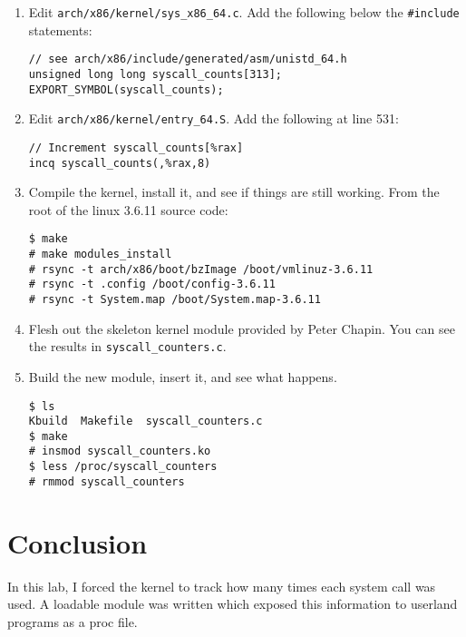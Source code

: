 \documentclass{article}
\newcommand{\filename}[1]{\texttt{#1}}
\newcommand{\code}[1]{\texttt{#1}}
\begin{document}
\begin{enumerate}
    \item Edit \filename{arch/x86/kernel/sys\_x86\_64.c}. Add the following
        below the \code{\#include} statements:
        \begin{lstlisting}
// see arch/x86/include/generated/asm/unistd_64.h
unsigned long long syscall_counts[313];
EXPORT_SYMBOL(syscall_counts);
        \end{lstlisting}

    \item Edit \filename{arch/x86/kernel/entry\_64.S}. Add the following at line
        531:
        \begin{lstlisting}
// Increment syscall_counts[%rax]
incq syscall_counts(,%rax,8)
        \end{lstlisting}

\lstset{ language=bash }

    \item Compile the kernel, install it, and see if things are still working.
        From the root of the linux 3.6.11 source code:
        \begin{lstlisting}
$ make
# make modules_install
# rsync -t arch/x86/boot/bzImage /boot/vmlinuz-3.6.11
# rsync -t .config /boot/config-3.6.11
# rsync -t System.map /boot/System.map-3.6.11
        \end{lstlisting}

    \item Flesh out the skeleton kernel module provided by Peter Chapin. You can
        see the results in \filename{syscall\_counters.c}.

    \item Build the new module, insert it, and see what happens.
        \begin{lstlisting}
$ ls
Kbuild  Makefile  syscall_counters.c
$ make
# insmod syscall_counters.ko
$ less /proc/syscall_counters
# rmmod syscall_counters
        \end{lstlisting}
\end{enumerate}

\section{Conclusion}
\label{sec:conclusion}

In this lab, I forced the kernel to track how many times each system call was
used. A loadable module was written which exposed this information to userland
programs as a proc file.
\end{document}
